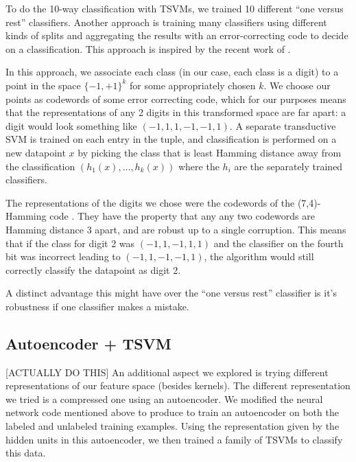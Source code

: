 \documentclass[11pt]{article}
\begin{document}
To do the 10-way classification with TSVMs, we trained 10 different ``one versus rest'' classifiers. Another approach is training many classifiers using different kinds of splits and aggregating the results with an error-correcting code to decide on a classification. This approach is inspired by the recent work of \cite{DBLP:journals/corr/BalcanDM15}.

In this approach, we associate each class (in our case, each class
is a digit) to a point in the space $\{-1,+1\}^k$
for some appropriately chosen $k$. We choose our points as codewords
of some error correcting code, which for our purposes means that the
representations of any 2 digits in this transformed space are
far apart: a digit would look something like $(-1,1,1,-1,-1,1)$.
A separate transductive SVM is trained on each entry in the tuple,
and classification is performed on a new datapoint $x$ by picking the
class that is least Hamming distance away from the classification
$(h_1(x),\ldots,h_k(x))$ where the $h_i$ are the separately trained
classifiers.

The representations of the digits we chose were the codewords of the
(7,4)-Hamming code \cite{macwilliams1977theory}. They have the property that any
any two codewords are Hamming distance 3 apart, and are robust up to
a single corruption. This means that if the class for digit 2 was
$(-1,1,-1,1,1)$ and the classifier on the fourth bit was incorrect
leading to $(-1,1,-1,-1,1)$, the algorithm would still correctly
classify the datapoint as digit 2.

A distinct advantage this might have over the ``one versus rest''
classifier is it's robustness if one classifier makes a mistake.

\subsection{Autoencoder + TSVM}

[ACTUALLY DO THIS] An additional aspect we explored is trying different representations of our feature space (besides kernels). The different representation we tried is a compressed one using an autoencoder. We modified the neural network code mentioned above to produce to train an autoencoder on both the labeled and unlabeled training examples. Using the representation given by the hidden units in this autoencoder, we then trained a family of TSVMs to classify this data.
\end{document}
